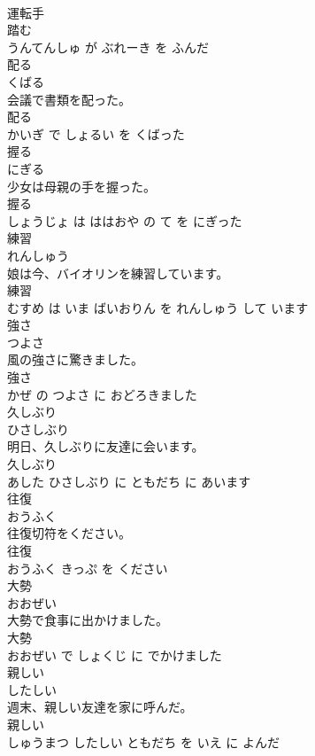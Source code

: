 \documentclass[8pt]{extreport}
\begin{document}
\begin{CJK}{UTF8}{min}
\\	運転手 
\\	踏む 
\\	うんてんしゅ が ぶれーき を ふんだ			
\\	配る	
\\	くばる			
\\	会議で書類を配った。	
\\	配る 
\\	かいぎ で しょるい を くばった			
\\	握る	
\\	にぎる			
\\	少女は母親の手を握った。	
\\	握る 
\\	しょうじょ は ははおや の て を にぎった			
\\	練習	
\\	れんしゅう			
\\	娘は今、バイオリンを練習しています。	
\\	練習 
\\	むすめ は いま ばいおりん を れんしゅう して います			
\\	強さ	
\\	つよさ			
\\	風の強さに驚きました。	
\\	強さ 
\\	かぜ の つよさ に おどろきました			
\\	久しぶり	
\\	ひさしぶり			
\\	明日、久しぶりに友達に会います。	
\\	久しぶり 
\\	あした ひさしぶり に ともだち に あいます			
\\	往復	
\\	おうふく			
\\	往復切符をください。	
\\	往復 
\\	おうふく きっぷ を ください			
\\	大勢	
\\	おおぜい			
\\	大勢で食事に出かけました。	
\\	大勢 
\\	おおぜい で しょくじ に でかけました			
\\	親しい	
\\	したしい			
\\	週末、親しい友達を家に呼んだ。	
\\	親しい 
\\	しゅうまつ したしい ともだち を いえ に よんだ			

\end{CJK}
\end{document}

